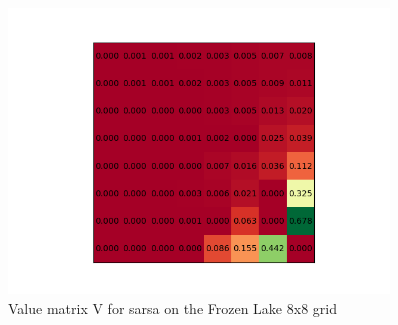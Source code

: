 \documentclass{article}
\begin{document}
\begin{figure}[H]
\centering
\includegraphics[width=0.9\textwidth]{figures/Long_V_sarsa.png}
\caption{Value matrix V for sarsa on the Frozen Lake 8x8 grid}
\label{fig:long_v_sarsa}
\end{figure}
\end{document}
